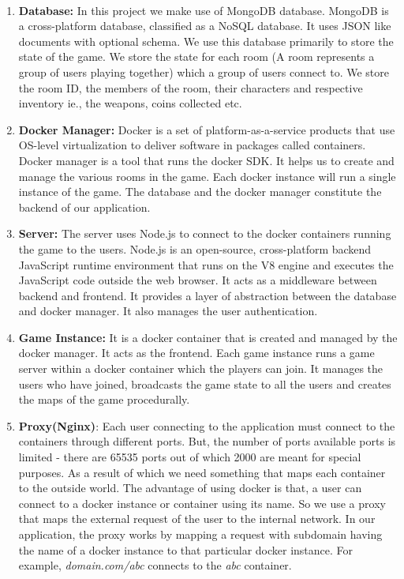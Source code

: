 \documentclass[oneside,12pt]{Classes/VTU}
\begin{document}
			\paragraph{}
			\begin{enumerate}
				\item \textbf{Database:} In this project we make use of MongoDB database. MongoDB is a cross-platform database, classified as a NoSQL database. It uses JSON like documents with optional schema. We use this database primarily to store the state of the game. We store the state for each room (A room represents a group of users playing together) which a group of users connect to. We store the room ID, the members of the room, their characters and respective inventory ie., the weapons, coins collected etc. 
				
				\item \textbf{Docker Manager:} Docker is a set of platform-as-a-service products that use OS-level virtualization to deliver software in packages called containers. Docker manager is a tool that runs the docker SDK. It helps us to create and manage the various rooms in the game. Each docker instance will run a single instance of the game. The database and the docker manager constitute the backend of our application. 
				
				\item \textbf{Server:} The server uses Node.js to connect to the docker containers running the game to the users. Node.js is an open-source, cross-platform backend JavaScript runtime environment that runs on the V8 engine and executes the JavaScript code outside the web browser. It acts as a middleware between backend and frontend. It provides a layer of abstraction between the database and docker manager. It also manages the user authentication. 
				
				\item \textbf{Game Instance:} It is a docker container that is created and managed by the docker manager. It acts as the frontend. Each game instance runs a game server within a docker container which the players can join. It manages the users who have joined, broadcasts the game state to all the users and creates the maps of the game procedurally. 
				
				\item \textbf{Proxy(Nginx)}: Each user connecting to the application must connect to the containers through different ports. But, the number of ports available ports is limited - there are 65535 ports out of which 2000 are meant for special purposes. As a result of which we need something that maps each container to the outside world. The advantage of using docker is that, a user can connect to a docker instance or container using its name. So we use a proxy that maps the external request of the user to the internal network. In our application, the proxy works by mapping a request with subdomain having the name of a docker instance to that particular docker instance. For example, \emph{domain.com/abc} connects to the \emph{abc} container. 
				

\end{enumerate}
\end{document}
